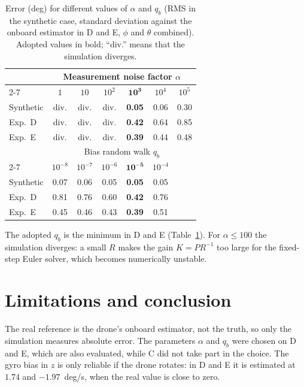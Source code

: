 \documentclass[11pt,a4paper]{article}
\begin{document}
\begin{table}[htbp]
\caption{Error (deg) for different values of $\alpha$ and $q_b$ (RMS in the synthetic case, standard deviation against the onboard estimator in D and E, $\phi$ and $\theta$ combined). Adopted values in bold; ``div.'' means that the simulation diverges.}
\label{tab:sens}
\centering
\setlength{\tabcolsep}{6pt}
\begin{tabular}{l cccccc}
\toprule
 & \multicolumn{6}{c}{Measurement noise factor $\alpha$} \\
\cmidrule(lr){2-7}
 & $1$ & $10$ & $10^{2}$ & $\mathbf{10^{3}}$ & $10^{4}$ & $10^{5}$ \\
\midrule
Synthetic & div. & div. & div. & \textbf{0.05} & 0.06 & 0.30 \\
Exp.\ D   & div. & div. & div. & \textbf{0.42} & 0.64 & 0.85 \\
Exp.\ E   & div. & div. & div. & \textbf{0.39} & 0.44 & 0.48 \\
\midrule
 & \multicolumn{6}{c}{Bias random walk $q_b$} \\
\cmidrule(lr){2-7}
 & $10^{-8}$ & $10^{-7}$ & $10^{-6}$ & $\mathbf{10^{-5}}$ & $10^{-4}$ & \\
\midrule
Synthetic & 0.07 & 0.06 & 0.05 & \textbf{0.05} & 0.05 & \\
Exp.\ D   & 0.81 & 0.76 & 0.60 & \textbf{0.42} & 0.76 & \\
Exp.\ E   & 0.45 & 0.46 & 0.43 & \textbf{0.39} & 0.51 & \\
\bottomrule
\end{tabular}
\end{table}

The adopted $q_b$ is the minimum in D and E (Table~\ref{tab:sens}).
For $\alpha\le100$ the simulation diverges: a small $R$ makes the gain $K=PR^{-1}$ too large for the fixed-step Euler solver, which becomes numerically unstable.

\section{Limitations and conclusion}
\label{sec:limits}

The real reference is the drone's onboard estimator, not the truth, so only the simulation measures absolute error.
The parameters $\alpha$ and $q_b$ were chosen on D and E, which are also evaluated, while C did not take part in the choice.
The gyro bias in $z$ is only reliable if the drone rotates: in D and E it is estimated at $1.74$ and $-1.97$~deg/s, when the real value is close to zero.
\end{document}
